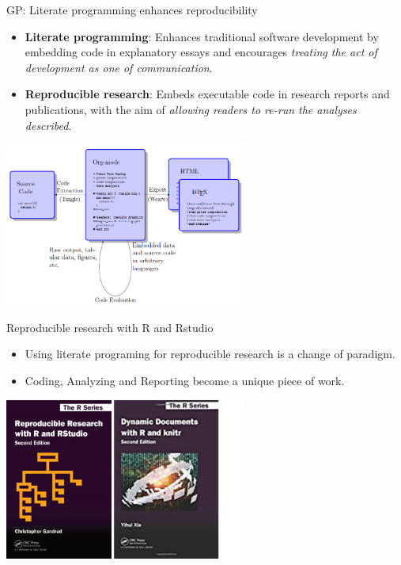 \documentclass[ignorenonframetext,]{beamer}
\providecommand{\tightlist}{%
  \setlength{\itemsep}{0pt}\setlength{\parskip}{0pt}}
\begin{document}
\begin{frame}{%
\protect\hypertarget{gp-literate-programming-enhances-reproducibility}{%
GP: Literate programming enhances reproducibility}}

\begin{itemize}
\item
  \textbf{Literate programming}: Enhances traditional software
  development by embedding code in explanatory essays and encourages
  \emph{treating the act of development as one of communication}.
\item
  \textbf{Reproducible research}: Embeds executable code in research
  reports and publications, with the aim of \emph{allowing readers to
  re-run the analyses described}.
\end{itemize}

\begin{center}
\includegraphics[width=0.6\textwidth]{"images/orgMode"}
\end{center}

\end{frame}

\begin{frame}{%
\protect\hypertarget{reproducible-research-with-r-and-rstudio}{%
Reproducible research with R and Rstudio}}

\begin{itemize}
\tightlist
\item
  Using literate programing for reproducible research is a change of
  paradigm.
\item
  Coding, Analyzing and Reporting become a unique piece of work.
\end{itemize}

\begin{center}
\includegraphics[width=0.6\textwidth]{"images/reproducibleResearchWithR"}
\end{center}

\end{frame}
\end{document}
